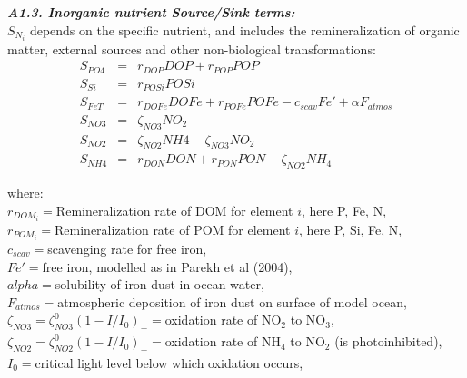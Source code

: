 \documentclass[11pt,letterpaper,english]{article}
\begin{document}
\vspace{.2cm}

{\it {\bf A1.3. Inorganic nutrient Source/Sink terms:}}\\
$S_{N_i}$ depends on the specific nutrient, and includes the remineralization
of organic matter, external sources and other non-biological transformations:
\begin{eqnarray}
S_{PO4} & = & r_{DOP} DOP + r_{POP} POP \nonumber \\
S_{Si}  & = & r_{POSi} POSi \nonumber \\
S_{FeT} & = &  r_{DOFe} DOFe + r_{POFe} POFe -c_{scav} Fe' + \alpha F_{atmos} \nonumber \\
S_{NO3} & = &  \zeta_{NO3} NO_2 \nonumber \\
S_{NO2} & = &  \zeta_{NO2} NH4 - \zeta_{NO3} NO_2 \nonumber \\
S_{NH4} & = &  r_{DON} DON + r_{PON} PON - \zeta_{NO2} NH_4 \nonumber
\end{eqnarray}

where:\\
\mbox{} \hspace{.5cm} $r_{DOM_i}=$Remineralization rate of DOM for element
$i$, here P, Fe, N,\\
\mbox{} \hspace{.5cm} $r_{POM_i}=$Remineralization rate of POM for element
$i$, here P, Si, Fe, N,\\
\mbox{} \hspace{.5cm} $c_{scav}=$scavenging rate for free iron,\\
\mbox{} \hspace{.5cm} $Fe'=$free iron, modelled as in Parekh et al (2004), \\
\mbox{} \hspace{.5cm} $alpha=$solubility of iron dust in ocean water, \\
\mbox{} \hspace{.5cm} $F_{atmos}=$atmospheric deposition of iron dust on surface of model ocean,\\
\mbox{} \hspace{.5cm} $\zeta_{NO3}=\zeta_{NO3}^0(1-I/I_0)_+=$oxidation rate of NO$_2$ to NO$_3$,\\
\mbox{} \hspace{.5cm} $\zeta_{NO2}=\zeta_{NO2}^0(1-I/I_0)_+=$oxidation rate of NH$_4$ to NO$_2$ (is photoinhibited),\\
\mbox{} \hspace{.5cm} $I_0=$critical light level below which oxidation occurs,\\
\end{document}
